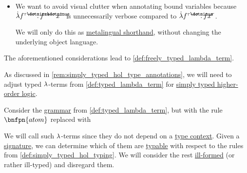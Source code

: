 \begin{remark}
\begin{itemize}
    \item We want to avoid visual clutter when annotating bound variables because \( \qabs {f^{\tau \synimplies \sigma}} f^{\tau \synimplies \sigma} x^\tau \) is unnecessarily verbose compared to \( \qabs {f^{\tau \synimplies \sigma}} f x^\tau \).

    We will only do this as \hyperref[con:metalogic]{metalingual shorthand}, without changing the underlying object language.
  \end{itemize}

  The aforementioned considerations lead to \cref{def:freely_typed_lambda_term}.
\end{remark}

\begin{definition}\label{def:freely_typed_lambda_term}\mimprovised
  As discussed in \cref{rem:simply_typed_hol_type_annotations}, we will need to adjust typed \( {\mathrm \lambda} \)-terms from \cref{def:typed_lambda_term} for \hyperref[def:simply_typed_hol]{simply typed higher-order logic}.

  Consider the \hyperref[def:formal_grammar]{grammar} from \cref{def:typed_lambda_term}, but with the rule \( \bnfpn{atom} \) replaced with
  \begin{bnf*}
     { \bnfor {}}
  \end{bnf*}

  We will call such \( {\mathrm \lambda} \)-terms  since they do not depend on a \hyperref[def:type_context]{type context}. Given a \hyperref[def:simply_typed_hol_signature]{signature}, we can determine which of them are \hyperref[def:typability]{typable} with respect to the rules from \cref{def:simply_typed_hol_typing}. We will consider the rest \hyperref[con:expression]{ill-formed} (or rather ill-typed) and disregard them.
\end{definition}
